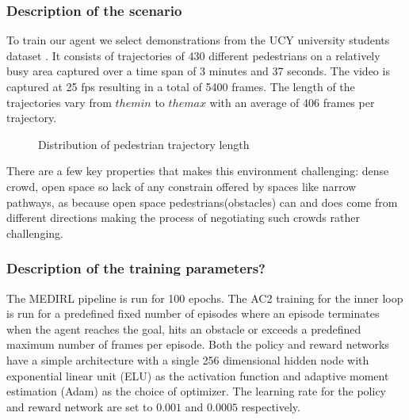 \subsubsection*{Description of the scenario}
To train our agent we select demonstrations from the UCY university students dataset \cite{ucy-dataset-university-students}. It consists of trajectories of 430 different pedestrians on a relatively busy area captured over a time span of 3 minutes and 37 seconds. The video is captured at 25 fps resulting in a total of 5400 frames. The length of the trajectories vary from $the min$  to $the max$ with an average of 406 frames per trajectory. 
\begin{figure}
	\caption {Distribution of pedestrian trajectory length}
\end{figure}
There are a few key properties that makes this environment challenging: dense crowd, open space so lack of any constrain offered by spaces like narrow pathways, as because open space pedestrians(obstacles) can and does come from different directions making the process of negotiating such crowds rather challenging. 

%			
\subsubsection*{Description of the training parameters?}

The MEDIRL pipeline is run for 100 epochs. The AC2 \cite{ac2} training for the inner loop is run for a predefined fixed number of episodes where an episode terminates when the agent reaches the goal, hits an obstacle or exceeds a predefined maximum number of frames per episode. Both the policy and reward networks have a simple architecture with a single 256 dimensional hidden node with exponential linear unit (ELU) \cite{exponential-linear-unit} as the activation function and adaptive moment estimation (Adam) \cite{adaptive-moment-estimation} as the choice of optimizer. The learning rate for the policy and reward network are set to $0.001$ and $0.0005$ respectively.


